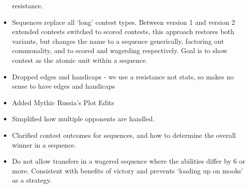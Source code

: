 \documentclass[
  11pt,
]{article}
\begin{document}
\begin{itemize}
  resistance.
\item
  Sequences replace all `long' contest types. Between version 1 and
  version 2 extended contests switched to scored contests, this approach
  restores both variants, but changes the name to a sequence
  generically, factoring out commonality, and to scored and wagerding
  respectively. Goal is to show contest as the atomic unit within a
  sequence.
\item
  Dropped edges and handicaps - we use a resistance not stats, so makes
  no sense to have edges and handicaps
\item
  Added Mythic Russia's Plot Edits
\item
  Simplified how multiple opponents are handled.
\item
  Clarified contest outcomes for sequences, and how to determine the
  overall winner in a sequence.
\item
  Do not allow transfers in a wagered sequence where the abilities
  differ by 6 or more. Consistent with benefits of victory and prevents
  `loading up on mooks' as a strategy.
\end{itemize}
\end{document}
